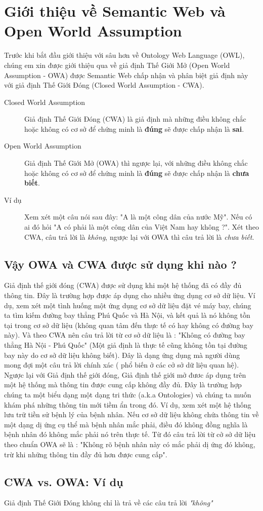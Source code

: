 \chapter{Giới thiệu về Semantic Web và Open World Assumption}
Trước khi bắt đầu giới thiệu với sâu hơn về Ontology Web Language (OWL), chúng em xin được giới thiệu qua về giả định Thế Giới Mở (Open World Assumption - OWA) được Semantic Web chấp nhận và phân biệt giả định này với giả định Thế Giới Đóng (Closed World Assumption - CWA).
\begin{description}
\item[Closed World Assumption] 
Giả định Thế Giới Đóng (CWA) là giả định mà những điều không chắc hoặc không có cơ sở để chứng minh là \textbf{đúng} sẽ được chấp nhận là \textbf{sai}.
\item[Open World Assumption]
Giả định Thế Giới Mở (OWA) thì ngược lại, với những điều không chắc hoặc không có cơ sở để chứng minh là \textbf{đúng} sẽ được chấp nhận là \textbf{chưa biết}. 
\item[Ví dụ]
Xem xét một câu nói sau đây: "A là một công dân của nước Mỹ". Nếu có ai đó hỏi "A có phải là một công dân của Việt Nam hay không ?". Xét theo CWA, câu trả lời là \textit{không}, ngược lại với OWA thì câu trả lời là \textit{chưa biết}. 
\end{description}
\section{Vậy OWA và CWA được sử dụng khi nào ?}
Giả định thế giới đóng (CWA) được sử dụng khi một hệ thống đã có đầy đủ thông tin. Đây là trường hợp được áp dụng cho nhiều ứng dụng cơ sở dữ liệu. Ví dụ, xem xét một tình huống một ứng dụng cơ sở dữ liệu đặt vé máy bay, chúng ta tìm kiếm đường bay thẳng Phú Quốc và Hà Nội, và kết quả là nó không tồn tại trong cơ sở dữ liệu (không quan tâm đến thực tế có hay không có đường bay này). Và theo CWA nên câu trả lời từ cơ sở dữ liệu là : "Không có đường bay thẳng Hà Nội - Phú Quốc" (Một giả định là thực tế cũng không tồn tại đường bay này do cơ sở dữ liệu không biết). Đây là dạng ứng dụng mà người dùng mong đợi một câu trả lời chính xác ( phổ biến ở các cở sở dữ liệu quan hệ).
Ngược lại với Giả định thế giới đóng, Giả định thế giới mở đươc áp dụng trên một hệ thống mà thông tin được cung cấp không đầy đủ. Đây là trường hợp chúng ta một biểu dạng một dạng tri thức (a.k.a Ontologies) và chúng ta muốn khám phá những thông tin mới tiềm ẩn trong đó. Ví dụ, xem xét một hệ thống lưu trữ tiền sử bệnh lý của bệnh nhân. Nếu cơ sở dữ liệu không chứa thông tin về một dạng dị ứng cụ thể mà bệnh nhân mắc phải, điều đó không đồng nghĩa là bệnh nhân đó không mắc phải nó trên thực tế. Từ đó câu trả lời từ cở sở dữ liệu theo chuẩn OWA sẽ là : "Không rõ bệnh nhân này có mắc phải dị ứng đó không, trừ khi những thông tin đầy đủ hơn được cung cấp".
\section{CWA vs. OWA: Ví dụ}
Giả định Thế Giới Đóng không chỉ là trả về các câu trả lời \textit{"không"} 
